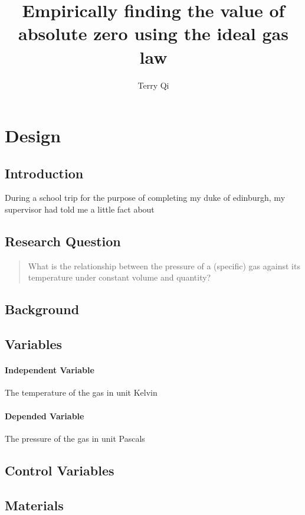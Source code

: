 \documentclass[a4paper,12pt]{article}
\title{Empirically finding the value of absolute zero using the ideal gas law}
\author{Terry Qi}
\begin{document}
\maketitle

\section{Design}
\subsection{Introduction}
During a school trip for the purpose of completing my duke of edinburgh, my supervisor had told me a little fact about  


\subsection{Research Question}
\begin{quote}
    What is the relationship between the pressure of a (specific) gas against its temperature under constant volume and quantity?
\end{quote}

\subsection{Background}



\subsection{Variables}
\paragraph{Independent Variable}
The temperature of the gas in unit Kelvin

\paragraph{Depended Variable}
The pressure of the gas in unit Pascals

\subsection{Control Variables}


\subsection{Materials}
\end{document}
